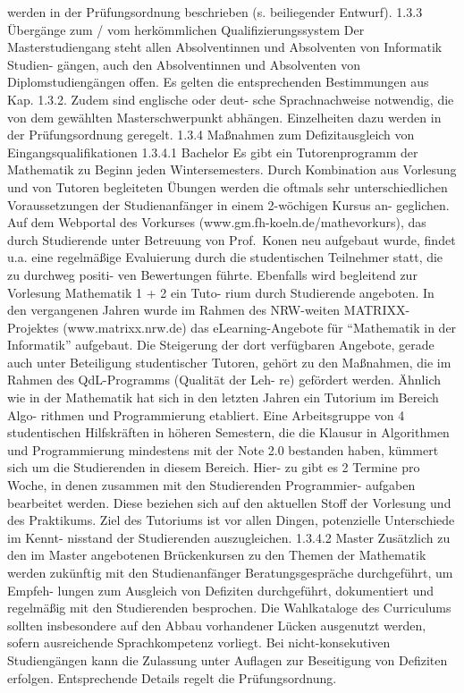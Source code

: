 werden in der Prüfungsordnung beschrieben (s. beiliegender Entwurf).
1.3.3 Übergänge zum / vom herkömmlichen Qualifizierungssystem Der
Masterstudiengang steht allen Absolventinnen und Absolventen von
Informatik Studien- gängen, auch den Absolventinnen und Absolventen von
Diplomstudiengängen offen. Es gelten die entsprechenden Bestimmungen aus
Kap. 1.3.2. Zudem sind englische oder deut- sche Sprachnachweise
notwendig, die von dem gewählten Masterschwerpunkt abhängen.
Einzelheiten dazu werden in der Prüfungsordnung geregelt. 1.3.4
Maßnahmen zum Defizitausgleich von Eingangsqualifikationen 1.3.4.1
Bachelor Es gibt ein Tutorenprogramm der Mathematik zu Beginn jeden
Wintersemesters. Durch Kombination aus Vorlesung und von Tutoren
begleiteten Übungen werden die oftmals sehr unterschiedlichen
Voraussetzungen der Studienanfänger in einem 2-wöchigen Kursus an-
geglichen. Auf dem Webportal des Vorkurses
(www.gm.fh-koeln.de/mathevorkurs), das durch Studierende unter Betreuung
von Prof.~Konen neu aufgebaut wurde, findet u.a. eine regelmäßige
Evaluierung durch die studentischen Teilnehmer statt, die zu durchweg
positi- ven Bewertungen führte. Ebenfalls wird begleitend zur Vorlesung
Mathematik 1 + 2 ein Tuto- rium durch Studierende angeboten. In den
vergangenen Jahren wurde im Rahmen des NRW-weiten MATRIXX-Projektes
(www.matrixx.nrw.de) das eLearning-Angebote für ``Mathematik in der
Informatik'' aufgebaut. Die Steigerung der dort verfügbaren Angebote,
gerade auch unter Beteiligung studentischer Tutoren, gehört zu den
Maßnahmen, die im Rahmen des QdL-Programms (Qualität der Leh- re)
gefördert werden. Ähnlich wie in der Mathematik hat sich in den letzten
Jahren ein Tutorium im Bereich Algo- rithmen und Programmierung
etabliert. Eine Arbeitsgruppe von 4 studentischen Hilfskräften in
höheren Semestern, die die Klausur in Algorithmen und Programmierung
mindestens mit der Note 2.0 bestanden haben, kümmert sich um die
Studierenden in diesem Bereich. Hier- zu gibt es 2 Termine pro Woche, in
denen zusammen mit den Studierenden Programmier- aufgaben bearbeitet
werden. Diese beziehen sich auf den aktuellen Stoff der Vorlesung und
des Praktikums. Ziel des Tutoriums ist vor allen Dingen, potenzielle
Unterschiede im Kennt- nisstand der Studierenden auszugleichen. 1.3.4.2
Master Zusätzlich zu den im Master angebotenen Brückenkursen zu den
Themen der Mathematik werden zukünftig mit den Studienanfänger
Beratungsgespräche durchgeführt, um Empfeh- lungen zum Ausgleich von
Defiziten durchgeführt, dokumentiert und regelmäßig mit den Studierenden
besprochen. Die Wahlkataloge des Curriculums sollten insbesondere auf
den Abbau vorhandener Lücken ausgenutzt werden, sofern ausreichende
Sprachkompetenz vorliegt. Bei nicht-konsekutiven Studiengängen kann die
Zulassung unter Auflagen zur Beseitigung von Defiziten erfolgen.
Entsprechende Details regelt die Prüfungsordnung.

